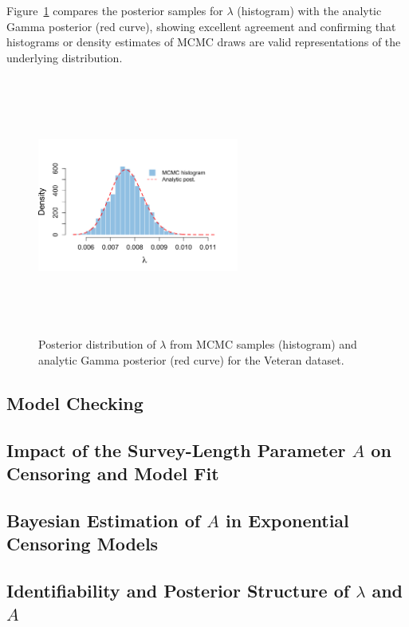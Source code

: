 Figure~\ref{fig:exp veteran} compares the posterior samples for $\lambda$ (histogram) with the analytic Gamma posterior (red curve), showing excellent agreement and confirming that histograms or density estimates of MCMC draws are valid representations of the underlying distribution.
\begin{figure}[H]
    \centering
    \includegraphics[height=8.5cm, width=0.59\textwidth]{images/veteran_post_lam.png}
    \caption{{\small Posterior distribution of $\lambda$ from MCMC samples (histogram) and analytic Gamma posterior (red curve) for the Veteran dataset.}}
    \label{fig:exp veteran}
\end{figure}










\subsection{Model Checking}\label{sec:model checking}


\subsection{Impact of the Survey-Length Parameter \texorpdfstring{$A$}{A} on Censoring and Model Fit}



\subsection{Bayesian Estimation of \texorpdfstring{$A$}{A} in Exponential Censoring Models}



\subsection{Identifiability and Posterior Structure of \texorpdfstring{$\lambda$}{lambda} and \texorpdfstring{$A$}{A}}















